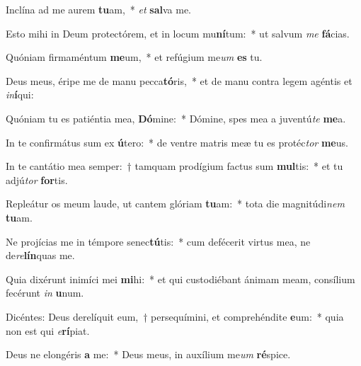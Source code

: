 \item Inclína ad me aurem \textbf{tu}am,~* \textit{et} \textbf{sal}va me.
\item Esto mihi in Deum protectórem, et in locum mu\textbf{ní}tum:~* ut salvum \textit{me} \textbf{fá}cias.
\item Quóniam firmaméntum \textbf{me}um,~* et refúgium me\textit{um} \textbf{es} tu.
\item Deus meus, éripe me de manu pecca\textbf{tó}ris,~* et de manu contra legem agéntis et \textit{in}\textbf{í}qui:
\item Quóniam tu es patiéntia mea, \textbf{Dó}mine:~* Dómine, spes mea a juventú\textit{te} \textbf{me}a.
\item In te confirmátus sum ex \textbf{ú}tero:~* de ventre matris meæ tu es protéc\textit{tor} \textbf{me}us.
\item In te cantátio mea semper:~† tamquam prodígium factus sum \textbf{mul}tis:~* et tu adjú\textit{tor} \textbf{for}tis.
\item Repleátur os meum laude, ut cantem glóriam \textbf{tu}am:~* tota die magnitúdi\textit{nem} \textbf{tu}am.
\item Ne projícias me in témpore senec\textbf{tú}tis:~* cum defécerit virtus mea, ne de\textit{re}\textbf{lín}quas me.
\item Quia dixérunt inimíci mei \textbf{mi}hi:~* et qui custodiébant ánimam meam, consílium fecérunt \textit{in} \textbf{u}num.
\item Dicéntes: Deus derelíquit eum,~† persequímini, et comprehéndite \textbf{e}um:~* quia non est qui \textit{e}\textbf{rí}piat.
\item Deus ne elongéris \textbf{a} me:~* Deus meus, in auxílium me\textit{um} \textbf{ré}spice.
